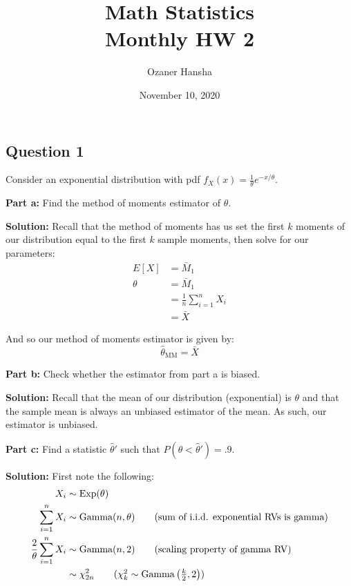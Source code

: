 \documentclass{article}
\begin{document}
\title{Math Statistics\\ Monthly HW 2}
\author{Ozaner Hansha}
\date{November 10, 2020}
\maketitle

\subsection*{Question 1}
Consider an exponential distribution with pdf $f_X(x)=\frac{1}{\theta}e^{-x/\theta}$.
\bigskip

\noindent\textbf{Part a:} Find the method of moments estimator of $\theta$.
\bigskip

\noindent\textbf{Solution:} Recall that the method of moments has us set the first $k$ moments of our distribution equal to the first $k$ sample moments, then solve for our parameters:
\begin{align*}
    E[X]&=\bar M_1\tag{method of moments}\\
    \theta&=\bar M_1\tag{mean of exponential RV}\\
    &=\frac{1}{n}\sum_{i=1}^nX_i\tag{def. of 1st sample moment}\\
    &=\bar X\tag{def. of sample mean}
\end{align*}

And so our method of moments estimator is given by:
$$\hat\theta_{\text{MM}}=\bar X$$
\bigskip

\noindent\textbf{Part b:} Check whether the estimator from part a is biased.
\bigskip

\noindent\textbf{Solution:} Recall that the mean of our distribution (exponential) is $\theta$ and that the sample mean is always an unbiased estimator of the mean. As such, our estimator is unbiased.
\bigskip

\noindent\textbf{Part c:} Find a statistic $\hat\theta'$ such that $P(\theta<\hat\theta')=.9$.
\bigskip

\noindent\textbf{Solution:} First note the following:
\begin{align*}
    X_i&\sim\text{Exp}(\theta)\\
    \sum_{i=1}^nX_i&\sim\text{Gamma}(n,\theta)\tag{sum of i.i.d. exponential RVs is gamma}\\
    \frac{2}{\theta}\sum_{i=1}^nX_i&\sim\text{Gamma}(n,2)\tag{scaling property of gamma RV}\\
    &\sim\chi^2_{2n}\tag{$\chi^2_k\sim\text{Gamma}\left(\frac{k}{2},2\right)$}
\end{align*}
\end{document}
